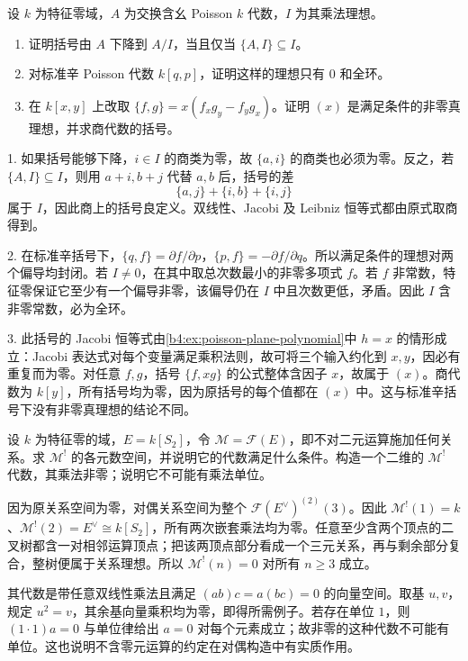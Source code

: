 \begin{exercise}\label{b4:ex:poisson-quotient-ideals}
	设 \(k\) 为特征零域，\(A\) 为交换含幺 Poisson \(k\) 代数，\(I\) 为其乘法理想。
	\begin{enumerate}
		\item 证明括号由 \(A\) 下降到 \(A/I\)，当且仅当 \(\{A,I\}\subseteq I\)。
		\item 对标准辛 Poisson 代数 \(k[q,p]\)，证明这样的理想只有 \(0\) 和全环。
		\item 在 \(k[x,y]\) 上改取 \(\{f,g\}=x(f_xg_y-f_yg_x)\)。证明 \((x)\) 是满足条件的非零真理想，并求商代数的括号。
	\end{enumerate}
\end{exercise}
\begin{solution}
	1. 如果括号能够下降，\(i\in I\) 的商类为零，故 \(\{a,i\}\) 的商类也必须为零。反之，若 \(\{A,I\}\subseteq I\)，则用 \(a+i,b+j\) 代替 \(a,b\) 后，括号的差
	\[
		\{a,j\}+\{i,b\}+\{i,j\}
	\]
	属于 \(I\)，因此商上的括号良定义。双线性、Jacobi 及 Leibniz 恒等式都由原式取商得到。

	2. 在标准辛括号下，\(\{q,f\}=\partial f/\partial p\)，\(\{p,f\}=-\partial f/\partial q\)。所以满足条件的理想对两个偏导均封闭。若 \(I\ne0\)，在其中取总次数最小的非零多项式 \(f\)。若 \(f\) 非常数，特征零保证它至少有一个偏导非零，该偏导仍在 \(I\) 中且次数更低，矛盾。因此 \(I\) 含非零常数，必为全环。

	3. 此括号的 Jacobi 恒等式由\cref{b4:ex:poisson-plane-polynomial}中 \(h=x\) 的情形成立：Jacobi 表达式对每个变量满足乘积法则，故可将三个输入约化到 \(x,y\)，因必有重复而为零。对任意 \(f,g\)，括号 \(\{f,xg\}\) 的公式整体含因子 \(x\)，故属于 \((x)\)。商代数为 \(k[y]\)，所有括号均为零，因为原括号的每个值都在 \((x)\) 中。这与标准辛括号下没有非零真理想的结论不同。
\end{solution}
\begin{exercise}\label{b4:ex:G-magmatic-dual}
	设 \(k\) 为特征零的域，\(E=k[S_2]\)，令 \(\mathcal M=\mathcal F(E)\)，即不对二元运算施加任何关系。求 \(\mathcal M^!\) 的各元数空间，并说明它的代数满足什么条件。构造一个二维的 \(\mathcal M^!\) 代数，其乘法非零；说明它不可能有乘法单位。
\end{exercise}
\begin{solution}
	因为原关系空间为零，对偶关系空间为整个 \(\mathcal F(E^\vee)^{(2)}(3)\)。因此 \(\mathcal M^!(1)=k\)、\(\mathcal M^!(2)=E^\vee\cong k[S_2]\)，所有两次嵌套乘法均为零。任意至少含两个顶点的二叉树都含一对相邻运算顶点；把该两顶点部分看成一个三元关系，再与剩余部分复合，整树便属于关系理想。所以 \(\mathcal M^!(n)=0\) 对所有 \(n\ge3\) 成立。

	其代数是带任意双线性乘法且满足 \((ab)c=a(bc)=0\) 的向量空间。取基 \(u,v\)，规定 \(u^2=v\)，其余基向量乘积均为零，即得所需例子。若存在单位 \(1\)，则 \((1\cdot1)a=0\) 与单位律给出 \(a=0\) 对每个元素成立；故非零的这种代数不可能有单位。这也说明不含零元运算的约定在对偶构造中有实质作用。
\end{solution}

